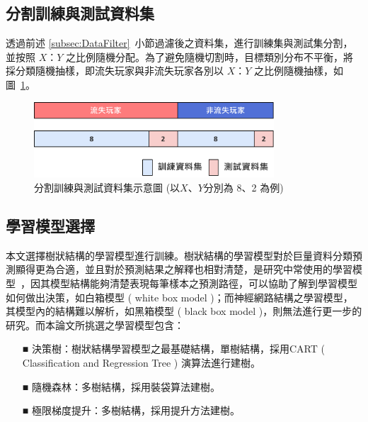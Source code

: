 \subsection{分割訓練與測試資料集}
\label{subsec:SplitDataset}

透過前述 \ref{subsec:DataFilter}~小節過濾後之資料集，進行訓練集與測試集分割，並按照 $X$：$Y$ 之比例隨機分配。為了避免隨機切割時，目標類別分布不平衡，將採分類隨機抽樣，即流失玩家與非流失玩家各別以 $X$：$Y$ 之比例隨機抽樣，如圖~\ref{fig:Image_SplitDataset}。

\begin{figure}[!htb]
  \begin{center}
    \includegraphics[width=0.8\textwidth]{figures/Image_SplitDataset.png}
    \caption[分割訓練與測試資料集示意圖]{分割訓練與測試資料集示意圖 (以$X$、$Y$分別為 8、2 為例) }
    \label{fig:Image_SplitDataset}
  \end{center}
\end{figure}

\subsection{學習模型選擇}
\label{subsec:ModelSelection}

本文選擇樹狀結構的學習模型進行訓練。樹狀結構的學習模型對於巨量資料分類預測顯得更為合適，並且對於預測結果之解釋也相對清楚，是研究中常使用的學習模型~\cite{wu2008top}，因其模型結構能夠清楚表現每筆樣本之預測路徑，可以協助了解到學習模型如何做出決策，如白箱模型 ( white box model )；而神經網路結構之學習模型，其模型內的結構難以解析，如黑箱模型 ( black box model )，則無法進行更一步的研究。而本論文所挑選之學習模型包含：
\newpage

\begin{itemize}
  \item [■] 決策樹：樹狀結構學習模型之最基礎結構，單樹結構，採用CART ( Classification and Regression Tree ) 演算法進行建樹。
  \item [■] 隨機森林：多樹結構，採用裝袋算法建樹。
  \item [■] 極限梯度提升：多樹結構，採用提升方法建樹。
\end{itemize}

